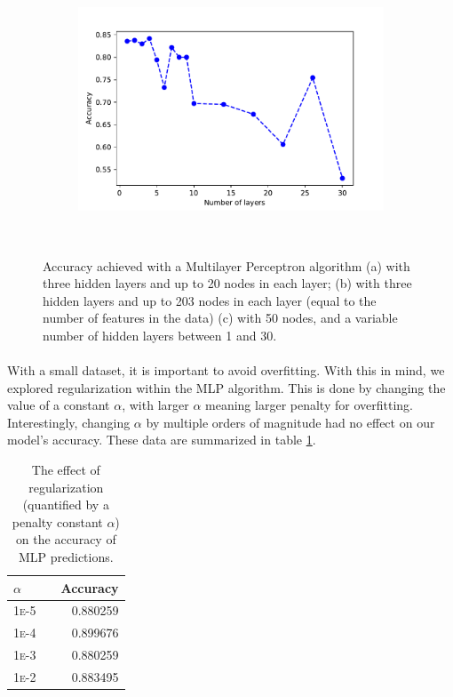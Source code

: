 \documentclass[11pt]{article}
\begin{document}
\begin{figure}[]
\begin{subfigure}[!t]{0.3\textwidth}
    \end{subfigure}
            \begin{subfigure}[!t]{0.3\textwidth}
        \includegraphics[width=\textwidth]{Plots/Alan_features_N_nodes_50_N_layers_1_30.pdf}
    \end{subfigure}\\
        \caption{Accuracy achieved with a Multilayer Perceptron algorithm (a) with three hidden layers and up to 20 nodes in each layer; (b) with three hidden layers and up to 203 nodes in each layer (equal to the number of features in the data) (c) with 50 nodes, and a variable number of hidden layers between 1 and 30.}
            \label{fig:MLP}
\end{figure}
\paragraph{}With a small dataset, it is important to avoid overfitting. With this in mind, we explored regularization within the MLP algorithm. This is done by changing the value of a constant $\alpha$, with larger $\alpha$ meaning larger penalty for overfitting. Interestingly, changing $\alpha$ by multiple orders of magnitude had no effect on our model's accuracy. These data are summarized in table \ref{tab:alpha}.
\begin{table}
\centering
\begin{tabular}{llr}
 \toprule
$\alpha$ &  & Accuracy \\
 \midrule
 \textsc{1e-5} & & 0.880259\\
 \textsc{1e-4} & & 0.899676 \\
 \textsc{1e-3} & & 0.880259 \\
 \textsc{1e-2} & & 0.883495\\
 \bottomrule
\end{tabular}
\caption{\label{tab:alpha} The effect of regularization (quantified by a penalty constant $\alpha$) on the accuracy of MLP predictions.}
\end{table}
\end{document}
